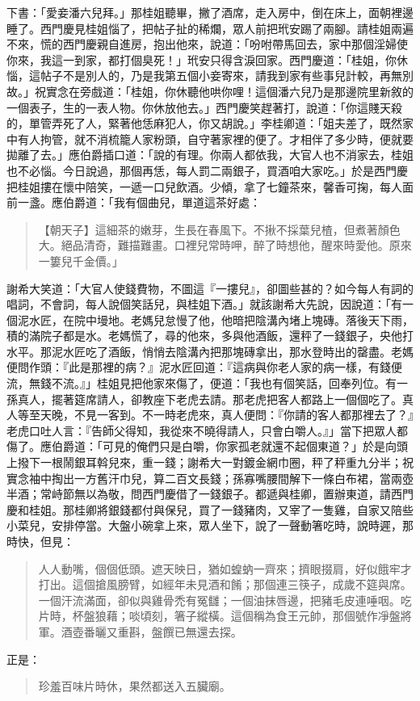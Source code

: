下書：「愛妾潘六兒拜。」那桂姐聽畢，撇了酒席，走入房中，倒在床上，面朝裡邊睡了。西門慶見桂姐惱了，把帖子扯的稀爛，眾人前把玳安踢了兩腳。請桂姐兩遍不來，慌的西門慶親自進房，抱出他來，說道：「吩咐帶馬回去，家中那個淫婦使你來，我這一到家，都打個臭死！」玳安只得含淚回家。西門慶道：「桂姐，你休惱，這帖子不是別人的，乃是我第五個小妾寄來，請我到家有些事兒計較，再無別故。」祝實念在旁戲道：「桂姐，你休聽他哄你哩！這個潘六兒乃是那邊院里新敘的一個表子，生的一表人物。你休放他去。」西門慶笑趕著打，說道：「你這賤天殺的，單管弄死了人，緊著他恁麻犯人，你又胡說。」李桂卿道：「姐夫差了，既然家中有人拘管，就不消梳籠人家粉頭，自守著家裡的便了。才相伴了多少時，便就要拋離了去。」應伯爵插口道：「說的有理。你兩人都依我，大官人也不消家去，桂姐也不必惱。今日說過，那個再恁，每人罰二兩銀子，買酒咱大家吃。」於是西門慶把桂姐摟在懷中陪笑，一遞一口兒飲酒。少傾，拿了七鐘茶來，馨香可掬，每人面前一盞。應伯爵道：「我有個曲兒，單道這茶好處：
\begin{quote}
【朝天子】這細茶的嫩芽，生長在春風下。不揪不採葉兒楂，但煮著顏色大。絕品清奇，難描難畫。口裡兒常時呷，醉了時想他，醒來時愛他。原來一簍兒千金價。」
\end{quote}

謝希大笑道：「大官人使錢費物，不圖這『一摟兒』，卻圖些甚的？如今每人有詞的唱詞，不會詞，每人說個笑話兒，與桂姐下酒。」就該謝希大先說，因說道：「有一個泥水匠，在院中墁地。老媽兒怠慢了他，他暗把陰溝內堵上塊磚。落後天下雨，積的滿院子都是水。老媽慌了，尋的他來，多與他酒飯，還秤了一錢銀子，央他打水平。那泥水匠吃了酒飯，悄悄去陰溝內把那塊磚拿出，那水登時出的罄盡。老媽便問作頭：『此是那裡的病？』泥水匠回道：『這病與你老人家的病一樣，有錢便流，無錢不流。』」桂姐見把他家來傷了，便道：「我也有個笑話，回奉列位。有一孫真人，擺著筵席請人，卻教座下老虎去請。那老虎把客人都路上一個個吃了。真人等至天晚，不見一客到。不一時老虎來，真人便問：『你請的客人都那裡去了？』老虎口吐人言：『告師父得知，我從來不曉得請人，只會白嚼人。』」當下把眾人都傷了。應伯爵道：「可見的俺們只是白嚼，你家孤老就還不起個東道？」於是向頭上撥下一根鬧銀耳斡兒來，重一錢；謝希大一對鍍金網巾圈，秤了秤重九分半；祝實念袖中掏出一方舊汗巾兒，算二百文長錢；孫寡嘴腰間解下一條白布裙，當兩壺半酒；常峙節無以為敬，問西門慶借了一錢銀子。都遞與桂卿，置辦東道，請西門慶和桂姐。那桂卿將銀錢都付與保兒，買了一錢豬肉，又宰了一隻雞，自家又陪些小菜兒，安排停當。大盤小碗拿上來，眾人坐下，說了一聲動箸吃時，說時遲，那時快，但見：
\begin{quote}
人人動嘴，個個低頭。遮天映日，猶如蝗蚋一齊來；擠眼掇肩，好似餓牢才打出。這個搶風膀臂，如經年未見酒和餚；那個連三筷子，成歲不筵與席。一個汗流滿面，卻似與雞骨禿有冤讎；一個油抹唇邊，把豬毛皮連唾咽。吃片時，杯盤狼藉；啖頃刻，箸子縱橫。這個稱為食王元帥，那個號作凈盤將軍。酒壺番曬又重斟，盤饌已無還去探。
\end{quote}
正是：
\begin{quote}
珍羞百味片時休，果然都送入五臟廟。
\end{quote}

